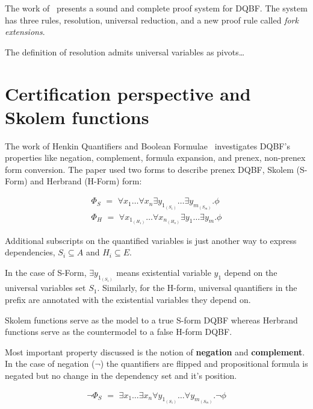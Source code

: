\documentclass[runningheads]{llncs}
\begin{document}
The work of~\cite{rabe2017resolution} presents a sound and complete proof system for DQBF.
%
The system has three rules, resolution, universal reduction, and a new proof rule called \textit{fork extensions}.

The definition of resolution admits universal variables as pivots\dots

\section{Certification perspective and Skolem functions}

The work of Henkin Quantifiers and Boolean Formulae~\cite{balabanov2012henkin} investigates DQBF's properties like negation, complement, formula expansion, and prenex, non-prenex form conversion.
%
The paper used two forms to describe prenex DQBF, Skolem (S-Form) and Herbrand (H-Form) form:

\begin{align}
\Phi_{S} \,\, = \,\, \forall x_{1}\dots \forall x_{n} \exists y_{1_{(S_{1})}}\dots\exists y_{m_{(S_{m})}} . \phi \label{eq1}\\
\Phi_{H}  \,\, = \,\, \forall x_{1_{(H_{1})}}\dots \forall x_{n_{(H_{n})}} \exists y_{1}\dots\exists y_{m} . \phi \label{eq2}
\end{align}

Additional subscripts on the quantified variables is just another way to express dependencies, $S_{i} \subseteq A$ and $H_{i} \subseteq E$.

In the case of S-Form, $\exists y_{1_{(S_{1})}}$ means  existential variable $y_{1}$ depend on the universal variables set $S_{1}$.
%
Similarly, for the H-form, universal quantifiers in the prefix are annotated with the existential variables they depend on.

Skolem functions serve as the model to a true S-form DQBF whereas Herbrand functions serve as the countermodel to a false H-form DQBF.

Most important property discussed is the notion of \textbf{negation} and \textbf{complement}.
%
In the case of negation ($\neg$) the quantifiers are flipped and propositional formula is negated but no change in the dependency set and it's position.

\begin{align}
\neg \Phi_{S} \,\, =   \,\, \exists x_{1}\dots \exists x_{n} \forall y_{1_{(S_{1})}}\dots\forall y_{m_{(S_{m})}} . \neg \phi \label{eq3}
\end{align}
\end{document}
